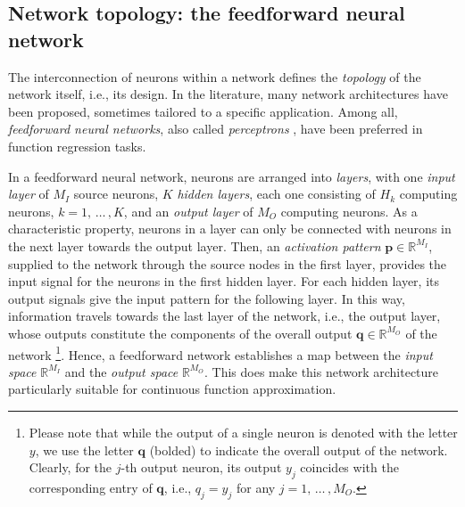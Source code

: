 \documentclass[longtitle]{elsarticle}
\numberwithin{equation}{section}
\theoremstyle{theorem}
\theoremstyle{definition}
\theoremstyle{remark}
\theoremstyle{proposition}
\numberwithin{figure}{section}
\begin{document}
		
	
	\subsection{Network topology: the feedforward neural network}
	\label{section:Network topology}
	
		The interconnection of neurons within a network defines the \emph{topology} of the network itself, i.e., its design. In the literature, many network architectures have been proposed, sometimes tailored to a specific application. Among all, \emph{feedforward neural networks}, also called \emph{perceptrons} \cite{Ros58}, have been preferred in function regression tasks.
		
		In a feedforward neural network, neurons are arranged into \emph{layers}, with one \emph{input layer} of $M_I$ source neurons, $K$ \emph{hidden layers}, each one consisting of $H_k$ computing neurons, $k = 1, \, \ldots \, , K$, and an \emph{output layer} of $M_O$ computing neurons. As a characteristic property, neurons in a layer can only be connected with neurons in the next layer towards the output layer. Then, an \emph{activation pattern} $\mathbf{p} \in \mathbb{R}^{M_I}$, supplied to the network through the source nodes in the first layer, provides the input signal for the neurons in the first hidden layer. For each hidden layer, its output signals give the input pattern for the following layer. In this way, information travels towards the last layer of the network, i.e., the output layer, whose outputs constitute the components of the overall output $\mathbf{q} \in \mathbb{R}^{M_O}$ of the network \footnote{Please note that while the output of a single neuron is denoted with the letter $y$, we use the letter $\mathbf{q}$ (bolded) to indicate the overall output of the network. Clearly, for the $j$-th output neuron, its output $y_j$ coincides with the corresponding entry of $\mathbf{q}$, i.e., $q_j = y_j$ for any $j = 1, \, \ldots \, , M_O$.}. Hence, a feedforward network establishes a map between the \emph{input space} $\mathbb{R}^{M_I}$ and the \emph{output space} $\mathbb{R}^{M_O}$. This does make this network architecture particularly suitable for continuous function approximation.
		
\end{document}
